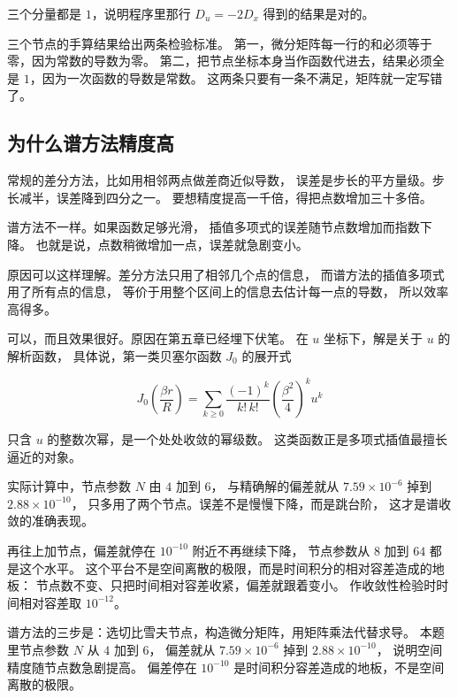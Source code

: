 三个分量都是 $1$，说明程序里那行 $D_u=-2D_x$ 得到的结果是对的。

\keypoint
三个节点的手算结果给出两条检验标准。
第一，微分矩阵每一行的和必须等于零，因为常数的导数为零。
第二，把节点坐标本身当作函数代进去，结果必须全是 $1$，因为一次函数的导数是常数。
这两条只要有一条不满足，矩阵就一定写错了。

\subsection{为什么谱方法精度高}

常规的差分方法，比如用相邻两点做差商近似导数，
误差是步长的平方量级。步长减半，误差降到四分之一。
要想精度提高一千倍，得把点数增加三十多倍。

谱方法不一样。如果函数足够光滑，
插值多项式的误差随节点数增加而指数下降。
也就是说，点数稍微增加一点，误差就急剧变小。

原因可以这样理解。差分方法只用了相邻几个点的信息，
而谱方法的插值多项式用了所有点的信息，
等价于用整个区间上的信息去估计每一点的导数，
所以效率高得多。

可以，而且效果很好。原因在第五章已经埋下伏笔。
在 $u$ 坐标下，解是关于 $u$ 的解析函数，
具体说，第一类贝塞尔函数 $J_0$ 的展开式

\begin{equation}
J_0\!\left(\frac{\beta r}{R}\right)
= \sum_{k\ge0}\frac{(-1)^k}{k!\,k!}\left(\frac{\beta^2}{4}\right)^{k}u^{k}
\end{equation}

只含 $u$ 的整数次幂，是一个处处收敛的幂级数。
这类函数正是多项式插值最擅长逼近的对象。

实际计算中，节点参数 $N$ 由 $4$ 加到 $6$，
与精确解的偏差就从 $7.59\times10^{-6}$ 掉到 $2.88\times10^{-10}$，
只多用了两个节点。误差不是慢慢下降，而是跳台阶，
这才是谱收敛的准确表现。

再往上加节点，偏差就停在 $10^{-10}$ 附近不再继续下降，
节点参数从 $8$ 加到 $64$ 都是这个水平。
这个平台不是空间离散的极限，而是时间积分的相对容差造成的地板：
节点数不变、只把时间相对容差收紧，偏差就跟着变小。
作收敛性检验时时间相对容差取 $10^{-12}$。

\keypoint
谱方法的三步是：选切比雪夫节点，构造微分矩阵，用矩阵乘法代替求导。
本题里节点参数 $N$ 从 $4$ 加到 $6$，
偏差就从 $7.59\times10^{-6}$ 掉到 $2.88\times10^{-10}$，
说明空间精度随节点数急剧提高。
偏差停在 $10^{-10}$ 是时间积分容差造成的地板，不是空间离散的极限。

